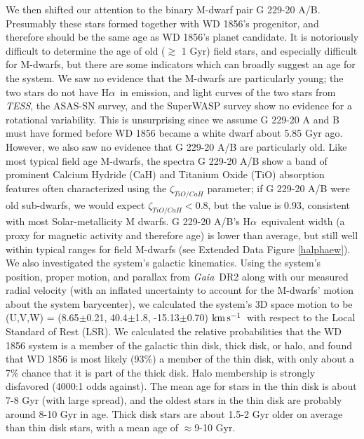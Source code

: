 \documentclass{nature3}
\newcommand{\halpha}{H$\alpha$}
\newcommand{\project}[1]{\textsl{#1}}
\newcommand{\Gaia}{\project{Gaia}}
\newcommand{\TESS}{\project{TESS}}
\newcommand{\kms}{\ensuremath{\rm km\,s^{-1}}}
\begin{document}
\begin{methods}
We then shifted our attention to the binary M-dwarf pair G 229-20 A/B. Presumably these stars formed together with WD 1856's progenitor, and therefore should be the same age as WD 1856's planet candidate. It is notoriously difficult to determine the age of old ($\gtrsim$ 1 Gyr) field stars, and especially difficult for M-dwarfs, but there are some indicators which can broadly suggest an age for the system. We saw no evidence that the M-dwarfs are particularly young; the two stars do not have \halpha\ in emission, and light curves of the two stars from \TESS, the ASAS-SN survey, and the SuperWASP survey show no evidence for a rotational variability. This is unsurprising since we assume G 229-20 A and B must have formed before WD 1856 became a white dwarf about 5.85 Gyr ago. However, we also saw no evidence that G 229-20 A/B are particularly old. Like most typical field age M-dwarfs, the spectra G 229-20 A/B show a band of prominent Calcium Hydride (CaH) and Titanium Oxide (TiO) absorption features\cite{gizis} often characterized using the $\zeta_{TiO/CaH}$ parameter\cite{lepine2006, mann2013}; if G 229-20 A/B were old sub-dwarfs, we would expect $\zeta_{TiO/CaH}<0.8$, but the value is 0.93, consistent with most Solar-metallicity M dwarfs. G 229-20 A/B's \halpha\ equivalent width (a proxy for magnetic activity and therefore age\cite{newton2017}) is lower than average, but still well within typical ranges for field M-dwarfs\cite{west11} (see Extended Data Figure \ref{halphaew}).  We also investigated the system's galactic kinematics. Using the system's position, proper motion, and parallax from \Gaia\ DR2 along with our measured radial velocity (with an inflated uncertainty to account for the M-dwarfs' motion about the system barycenter), we calculated the system's 3D space motion to be (U,V,W) = (8.65$\pm$0.21, 40.4$\pm$1.8, -15.13$\pm$0.70) \kms\ with respect to the Local Standard of Rest (LSR\cite{lsr}).  We calculated the relative probabilities\cite{bensby14, carrillo2020} that the WD 1856 system is a member of the galactic thin disk, thick disk, or halo, and found that WD 1856 is most likely (93\%) a member of the thin disk, with only about a 7\% chance that it is part of the thick disk. Halo membership is strongly disfavored (4000:1 odds against). The mean age for stars in the thin disk is about 7-8 Gyr\cite{kilic2017} (with large spread), and the oldest stars in the thin disk are probably around 8-10 Gyr in age\cite{haywood2013, xiang}. Thick disk stars are about 1.5-2 Gyr older on average than thin disk stars, with a mean age of $\approx$9-10 Gyr\cite{kilic2017, sharma}. 


\end{methods}
\end{document}
